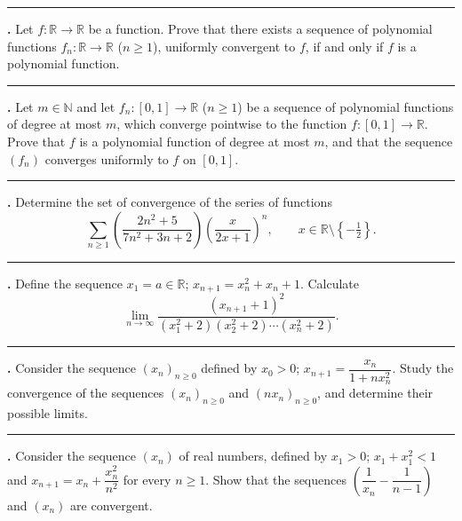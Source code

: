 \documentclass[11pt]{article}
\newcounter{probnum}
\newenvironment{problembox}{\par\noindent\rule{\linewidth}{0.5pt}\vspace{5pt}\par}{\vspace{2pt}}
\begin{document}
\begin{problembox}
\textbf{\theprobnum.} Let $f : \mathbb{R} \to \mathbb{R}$ be a function. Prove that there exists a sequence of polynomial functions $f_n : \mathbb{R} \to \mathbb{R}$ ($n \ge 1$), uniformly convergent to $f$, if and only if $f$ is a polynomial function.
\end{problembox}

\begin{problembox}
\textbf{\theprobnum.} Let $m \in \mathbb{N}$ and let $f_n : [0,1] \to \mathbb{R}$ ($n \ge 1$) be a sequence of polynomial functions of degree at most $m$, which converge pointwise to the function $f : [0,1] \to \mathbb{R}$. Prove that $f$ is a polynomial function of degree at most $m$, and that the sequence $(f_n)$ converges uniformly to $f$ on $[0,1]$.
\end{problembox}

\begin{problembox}
\textbf{\theprobnum.} Determine the set of convergence of the series of functions
\[
\sum_{n \ge 1} \left(\frac{2n^2+5}{7n^2+3n+2}\right) \left(\frac{x}{2x+1}\right)^n, \qquad x \in \mathbb{R} \setminus \left\{-\tfrac{1}{2}\right\}.
\]
\end{problembox}

\begin{problembox}
\textbf{\theprobnum.} Define the sequence $x_1 = a \in \mathbb{R}$; $x_{n+1} = x_n^2 + x_n + 1$. Calculate
\[
\lim_{n \to \infty} \frac{(x_{n+1}+1)^2}{(x_1^2+2)(x_2^2+2)\cdots(x_n^2+2)}.
\]
\end{problembox}

\begin{problembox}
\textbf{\theprobnum.} Consider the sequence $(x_n)_{n \ge 0}$ defined by $x_0 > 0$; $x_{n+1} = \dfrac{x_n}{1+n x_n^2}$. Study the convergence of the sequences $(x_n)_{n\ge 0}$ and $(n x_n)_{n \ge 0}$, and determine their possible limits.
\end{problembox}

\begin{problembox}
\textbf{\theprobnum.} Consider the sequence $(x_n)$ of real numbers, defined by $x_1 > 0$; $x_1 + x_1^2 < 1$ and $x_{n+1} = x_n + \dfrac{x_n^2}{n^2}$ for every $n \ge 1$. Show that the sequences $\left(\dfrac{1}{x_n} - \dfrac{1}{n-1}\right)$ and $(x_n)$ are convergent.
\end{problembox}
\end{document}
